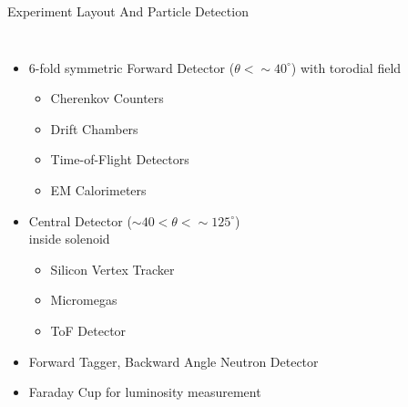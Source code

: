 \documentclass[aspectratio=169]{beamer}
\begin{document}
\begin{frame}{Experiment Layout And Particle Detection} \label{frame:datasets3}
\vspace{-0.5cm}
        \begin{columns}[t, onlytextwidth]
                \begin{itemize}
                    \setlength\itemsep{.35em}
                    \item 6-fold symmetric Forward Detector ($\theta < \sim 40 ^{\circ}$) with torodial field
                     \begin{itemize}
                    \setlength\itemsep{.25em}
                        \item Cherenkov Counters
                        \item Drift Chambers
                        \item Time-of-Flight Detectors
                        \item EM Calorimeters
                    \end{itemize}
                      \item Central Detector ($\sim40 < \theta < \sim 125 ^{\circ}$) \\
                      inside solenoid
                     \begin{itemize}
                    \setlength\itemsep{.25em}
                        \item Silicon Vertex Tracker
                        \item Micromegas
                        \item ToF Detector

                    \end{itemize}
                    
                    \item Forward Tagger, Backward Angle Neutron Detector
                    \item Faraday Cup for luminosity measurement
                
            
                \end{itemize}
            
                \vspace{0.1cm}
                

\end{columns}
\end{frame}
\end{document}
